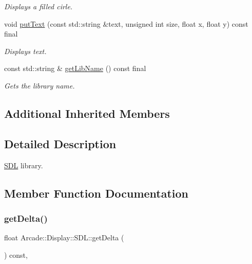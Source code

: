 \begin{DoxyCompactItemize}
\begin{DoxyCompactList}\small\item\em Displays a filled cirle. \end{DoxyCompactList}\item 
void \mbox{\hyperlink{classArcade_1_1Display_1_1SDL_aa3bd454c083beb16300bb799ed268ef7}{put\+Text}} (const std\+::string \&text, unsigned int size, float x, float y) const final
\begin{DoxyCompactList}\small\item\em Displays text. \end{DoxyCompactList}\item 
const std\+::string \& \mbox{\hyperlink{classArcade_1_1Display_1_1SDL_aa549d6ec470b99b545db63a1d4a2b58e}{get\+Lib\+Name}} () const final
\begin{DoxyCompactList}\small\item\em Gets the library name. \end{DoxyCompactList}\end{DoxyCompactItemize}
\subsection*{Additional Inherited Members}


\subsection{Detailed Description}
\mbox{\hyperlink{classArcade_1_1Display_1_1SDL}{S\+DL}} library. 

\subsection{Member Function Documentation}
\mbox{\label{classArcade_1_1Display_1_1SDL_a1ca09d130dea3bec2481eb72a49c0f03}} 
\subsubsection{\texorpdfstring{getDelta()}{getDelta()}}
{\footnotesize\ttfamily float Arcade\+::\+Display\+::\+S\+D\+L\+::get\+Delta (\begin{DoxyParamCaption}{ }\end{DoxyParamCaption}) const\hspace{0.3cm}{\ttfamily [final]}, {\ttfamily [virtual]}}



